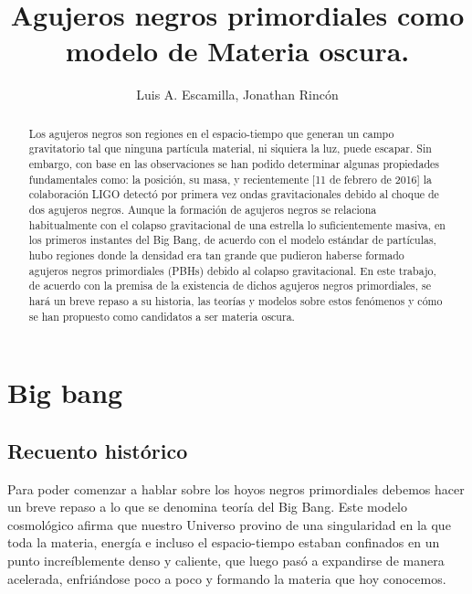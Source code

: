 \documentclass{article}
\title{Agujeros negros primordiales como modelo de Materia oscura.}
\author{Luis A. Escamilla, Jonathan Rinc\'on}
\begin{document}
\maketitle

  \begin{@twocolumnfalse}
    \maketitle
    \begin{abstract}
      Los agujeros negros son regiones en el espacio-tiempo que generan un campo gravitatorio tal que ninguna part\'icula material, ni siquiera la luz, puede escapar. Sin embargo, con base en las observaciones se han podido determinar algunas propiedades fundamentales como: la posici\'on, su masa, y recientemente [11 de febrero de 2016] la colaboraci\'on LIGO detect\'o por primera vez ondas gravitacionales debido al choque de dos agujeros negros.
Aunque la formaci\'on de agujeros negros se relaciona habitualmente con el colapso gravitacional de una estrella lo suficientemente masiva, en los primeros instantes del Big Bang, de acuerdo con el modelo est\'andar de part\'iculas, hubo regiones donde la densidad era tan grande que pudieron haberse formado agujeros negros primordiales (PBHs) debido al colapso gravitacional. En este trabajo, de acuerdo con la premisa de la existencia de dichos agujeros negros primordiales, se har\'a un breve repaso a su historia, las teor\'ias y modelos sobre estos fen\'omenos y c\'omo se han propuesto como candidatos a ser materia oscura.
    \end{abstract}
  \end{@twocolumnfalse}



\section*{Big bang} 
\subsection*{Recuento hist\'orico}
Para poder comenzar a hablar sobre los hoyos negros primordiales debemos hacer un breve repaso a lo que se denomina teor\'ia del Big Bang. Este modelo cosmol\'ogico afirma que nuestro Universo provino de una singularidad en la que toda la materia, energ\'ia e incluso el espacio-tiempo estaban confinados en un punto incre\'iblemente denso y caliente, que luego pas\'o a expandirse de manera acelerada, enfri\'andose poco a poco y formando la materia que hoy conocemos. 
\end{document}
